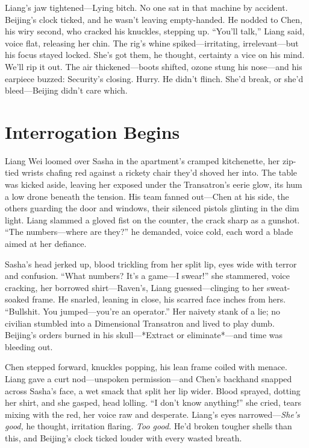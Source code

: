 \documentclass[12pt]{book}
\begin{document}
Liang’s jaw tightened—Lying bitch. No one sat in that machine by accident. Beijing’s clock ticked, and he wasn’t leaving empty-handed. He nodded to Chen, his wiry second, who cracked his knuckles, stepping up. “You’ll talk,” Liang said, voice flat, releasing her chin. The rig’s whine spiked—irritating, irrelevant—but his focus stayed locked. She’s got them, he thought, certainty a vice on his mind. We’ll rip it out. The air thickened—boots shifted, ozone stung his nose—and his earpiece buzzed: Security’s closing. Hurry. He didn’t flinch. She’d break, or she’d bleed—Beijing didn’t care which.

\section{Interrogation Begins}

Liang Wei loomed over Sasha in the apartment’s cramped kitchenette, her zip-tied wrists chafing red against a rickety chair they’d shoved her into. The table was kicked aside, leaving her exposed under the Transatron’s eerie glow, its hum a low drone beneath the tension. His team fanned out—Chen at his side, the others guarding the door and windows, their silenced pistols glinting in the dim light. Liang slammed a gloved fist on the counter, the crack sharp as a gunshot. “The numbers—where are they?” he demanded, voice cold, each word a blade aimed at her defiance.

Sasha’s head jerked up, blood trickling from her split lip, eyes wide with terror and confusion. “What numbers? It’s a game—I swear!” she stammered, voice cracking, her borrowed shirt—Raven’s, Liang guessed—clinging to her sweat-soaked frame. He snarled, leaning in close, his scarred face inches from hers. “Bullshit. You jumped—you’re an operator.” Her naivety stank of a lie; no civilian stumbled into a Dimensional Transatron and lived to play dumb. Beijing’s orders burned in his skull—*Extract or eliminate*—and time was bleeding out.

Chen stepped forward, knuckles popping, his lean frame coiled with menace. Liang gave a curt nod—unspoken permission—and Chen’s backhand snapped across Sasha’s face, a wet smack that split her lip wider. Blood sprayed, dotting her shirt, and she gasped, head lolling. “I don’t know anything!” she cried, tears mixing with the red, her voice raw and desperate. Liang’s eyes narrowed—\textit{She’s good,} he thought, irritation flaring. \textit{Too good.} He’d broken tougher shells than this, and Beijing’s clock ticked louder with every wasted breath.
\end{document}
